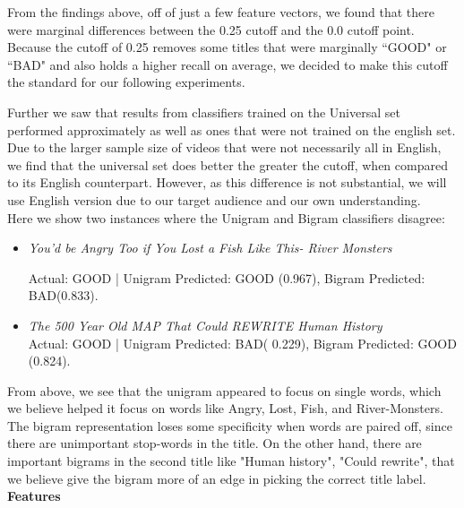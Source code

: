 \documentclass[a4paper,12pt]{article}
\begin{document}
From the findings above, off of just a few feature vectors, we found that there were marginal differences between the 0.25 cutoff and the 0.0 cutoff point. Because the cutoff of 0.25 removes some titles that were marginally ``GOOD" or ``BAD" and also holds a higher recall on average, we decided to make this cutoff the standard for our following experiments.  

Further we saw that results from classifiers trained on the Universal set performed approximately as well as ones that were not trained on the english set. Due to the larger sample size of videos that were not necessarily all in English, we find that the universal set does better the greater the cutoff, when compared to its English counterpart. However, as this difference is not substantial, we will use English version due to our target audience and our own understanding.\\


Here we show two instances where the Unigram and Bigram classifiers disagree:\\
\begin{itemize}
		\item \textit{You'd be Angry Too if You Lost a Fish Like This- River Monsters}
		 
		 Actual: GOOD | Unigram Predicted: GOOD (0.967), Bigram Predicted: BAD(0.833).
		 
	
	\item \textit{The 500 Year Old MAP That Could REWRITE Human History }\\
	  Actual: GOOD | Unigram Predicted: BAD( 0.229), Bigram Predicted: GOOD (0.824).
 
 \end{itemize}

From above, we see that the unigram appeared to focus on single words, which we believe helped it focus on words like Angry, Lost, Fish, and River-Monsters. The bigram representation loses some specificity when words are paired off, since there are unimportant stop-words in the title. On the other hand, there are important bigrams in the second title like "Human history", "Could rewrite", that we believe give the bigram more of an edge in picking the correct title label.\\


\textbf{Features}
\end{document}
